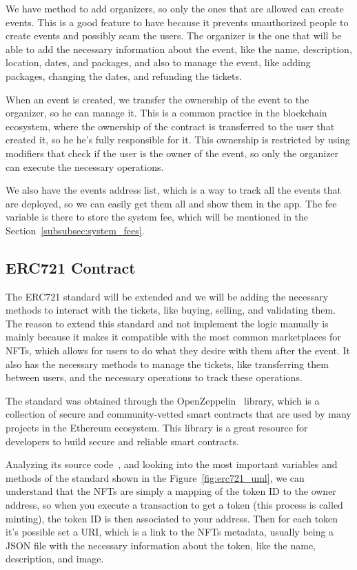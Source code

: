 We have method to add organizers, so only the ones that are allowed can create
events. This is a good feature to have because it prevents unauthorized people
to create events and possibly scam the users. The organizer is the one that
will be able to add the necessary information about the event, like the name,
description, location, dates, and packages, and also to manage the event, like
adding packages, changing the dates, and refunding the tickets.

When an event is created, we transfer the ownership of the event to the
organizer, so he can manage it. This is a common practice in the blockchain
ecosystem, where the ownership of the contract is transferred to the user that
created it, so he he's fully responsible for it. This ownership is restricted
by using modifiers that check if the user is the owner of the event, so only
the organizer can execute the necessary operations.

We also have the events address list, which is a way to track all the events
that are deployed, so we can easily get them all and show them in the app. The
fee variable is there to store the system fee, which will be mentioned in the
Section~\ref{subsubsec:system_fees}.

\subsection{ERC721 Contract}\label{subsec:erc721_contract}

The ERC721 standard will be extended and we will be adding the necessary
methods to interact with the tickets, like buying, selling, and validating
them. The reason to extend this standard and not implement the logic manually
is mainly because it makes it compatible with the most common marketplaces for
NFTs, which allows for users to do what they desire with them after the event.
It also has the necessary methods to manage the tickets, like transferring them
between users, and the necessary operations to track these operations.

The standard was obtained through the OpenZeppelin~\cite{openzeppelin} library,
which is a collection of secure and community-vetted smart contracts that are
used by many projects in the Ethereum ecosystem. This library is a great
resource for developers to build secure and reliable smart contracts.

Analyzing its source code~\cite{erc721}, and looking into the most important
variables and methods of the standard shown in the Figure~\ref{fig:erc721_uml},
we can understand that the NFTs are simply a mapping of the token ID to the
owner address, so when you execute a transaction to get a token (this process
is called minting), the token ID is then associated to your address. Then for
each token it's possible set a URI, which is a link to the NFTs metadata,
usually being a JSON file with the necessary information about the token, like
the name, description, and image.

